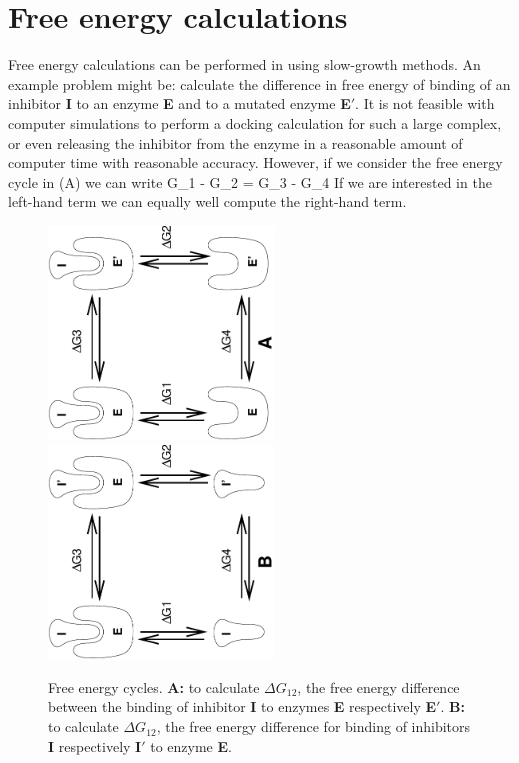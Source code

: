 \section{Free energy calculations}
\label{sec:fecalc}
Free energy calculations can be performed
in {\gromacs} using slow-growth methods. An example problem might be:
calculate the difference in free energy of binding of an inhibitor {\bf I}
to an enzyme {\bf E} and to a mutated enzyme {\bf E$\prime$}.
It is not feasible with computer simulations to perform a docking
calculation for such a large complex, or even releasing the inhibitor from
the enzyme in a reasonable amount of computer time with reasonable accuracy.
However, if we consider the free energy cycle in (A)
we can write
\beq
\Delta G_1 - \Delta G_2 =       \Delta G_3 - \Delta G_4
\label{eqn:ddg}
\eeq
If we are interested in the left-hand term we can equally well compute
the right-hand term.
\begin{figure}
\centerline{\includegraphics[width=6cm,angle=270]{plots/free1}\hspace{2cm}\includegraphics[width=6cm,angle=270]{plots/free2}}
\caption[Free energy cycles.]{Free energy cycles. {\bf A:} to
calculate $\Delta G_{12}$, the free energy difference between the
binding of inhibitor {\bf I} to enzymes {\bf E} respectively {\bf
E$\prime$}. {\bf B:} to calculate $\Delta G_{12}$, the free energy
difference for binding of inhibitors {\bf I} respectively {\bf I$\prime$} to
enzyme {\bf E}.}
\label{fig:free}
\end{figure}

